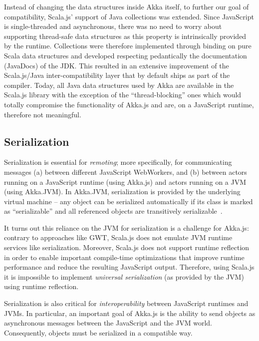 \documentclass{sig-alternate}
\begin{document}
Instead of changing the data structures inside Akka itself, to further our goal of compatibility, Scala.js' support of Java collections was extended.
Since JavaScript is single-threaded and asynchronous, there was no need to worry about supporting thread-safe data structures as this property is intrinsically provided by the runtime.
Collections were therefore implemented through binding on pure Scala data structures and developed respecting pedantically the documentation (JavaDocs) of the JDK.
This resulted in an extensive improvement of the Scala.js/Java inter-compatibility layer that by default ships as part of the compiler.
Today, all Java data structures used by Akka are available in the Scala.js library with the exception of the ``thread-blocking'' ones which would totally compromise the functionality of Akka.js and are, on a JavaScript runtime, therefore not meaningful.


\subsection{Serialization}\label{sec:serialization}

Serialization is essential for {\em remoting}; more specifically, for
communicating messages (a) between different
JavaScript WebWorkers, and (b) between actors running on a JavaScript
runtime (using Akka.js) and actors running on a JVM (using Akka.JVM).
In Akka.JVM, serialization is provided by the underlying virtual
machine – any object can be serialized automatically if its class is
marked as ``serializable'' and all referenced objects are
transitively serializable~\cite{Philippsen2000,Maassen1999}.

It turns out this reliance on the JVM for serialization is a challenge for
Akka.js: contrary to approaches like GWT, Scala.js does not emulate JVM
runtime services like serialization. Moreover, Scala.js does not support
runtime reflection in order to enable important compile-time optimizations
that improve runtime performance and reduce the resulting JavaScript output. Therefore,
using Scala.js it is impossible to implement {\em universal serialization} (as
provided by the JVM) using runtime reflection.

Serialization is also critical for {\em interoperability} between JavaScript
runtimes and JVMs. In particular, an important goal of Akka.js is the
ability to send objects as asynchronous messages between the JavaScript
and the JVM world. Consequently, objects must be serialized in a compatible
way.
\end{document}
